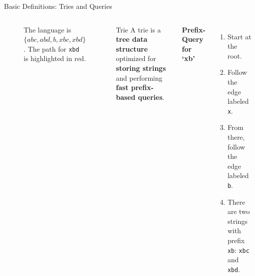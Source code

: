 \documentclass[aspectratio=169]{beamer}
\begin{document}
\begin{frame}{Basic Definitions: Tries and Queries}
\begin{columns}[c]
\begin{figure}
			\caption{The language is $\{abc, abd, b, xbc, xbd\}$. The path for \texttt{xbd} is highlighted in red.}
			\label{fig:trie_example}
		\end{figure}
		\begin{block}{Trie}
			A trie is a \textcolor{oiVermillion}{\textbf{tree data structure}} optimized for \textcolor{oiRed}{\textbf{storing strings}} and performing \textcolor{oiPurple}{\textbf{fast prefix-based queries}}.
		\end{block}
		\textcolor{oiBlue}{\textbf{Prefix-Query for `xb'}} \\
		\small
		\begin{enumerate}
			\item Start at the root.
			\item Follow the edge labeled \texttt{x}.
			\item From there, follow the edge labeled \texttt{b}.
			\item There are two strings with prefix \texttt{xb}: \texttt{xbc} and \texttt{xbd}.
		\end{enumerate}
	\end{columns}
\end{frame}
\end{document}
